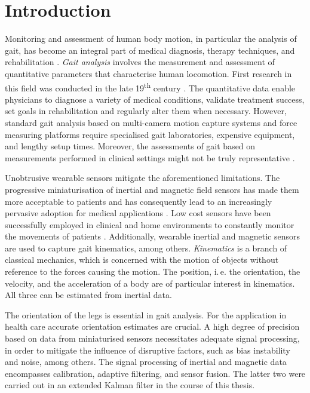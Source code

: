 \chapter{Introduction}
\label{ch:Introduction}

Monitoring and assessment of human body motion, in particular the analysis of gait, has become an integral part of medical diagnosis, therapy techniques, and rehabilitation \cite{tao_gait_2012}. \emph{Gait analysis} involves the measurement and assessment of quantitative parameters that characterise human locomotion. First research in this field was conducted in the late 19\textsuperscript{th} century \cite{tao_gait_2012}. The quantitative data enable physicians to diagnose a variety of medical conditions, validate treatment success, set goals in rehabilitation and regularly alter them when necessary. However, standard gait analysis based on multi-camera motion capture systems and force measuring platforms require specialised gait laboratories, expensive equipment, and lengthy setup times. Moreover, the assessments of gait based on measurements performed in clinical settings might not be truly representative \cite{bonato_advances_2005}.

Unobtrusive wearable sensors mitigate the aforementioned limitations. The progressive miniaturisation of inertial and magnetic field sensors has made them more acceptable to patients and has consequently lead to an increasingly pervasive adoption for medical applications \cite{wee_soon_ambulatory_2008}. Low cost sensors have been successfully employed in clinical and home environments to constantly monitor the movements of patients \cite{godfrey_direct_2008}. Additionally, wearable inertial and magnetic sensors are used to capture gait kinematics, among others. \emph{Kinematics} is a branch of classical mechanics, which is concerned with the motion of objects without reference to the forces causing the motion. The position, i.\,e. the orientation, the velocity, and the acceleration of a body are of particular interest in kinematics. All three can be estimated from inertial data.

The orientation of the legs is essential in gait analysis. For the application in health care accurate orientation estimates are crucial. A high degree of precision based on data from miniaturised sensors necessitates adequate signal processing, in order to mitigate the influence of disruptive factors, such as bias instability and noise, among others. The signal processing of inertial and magnetic data encompasses calibration, adaptive filtering, and sensor fusion. The latter two were carried out in an extended Kalman filter in the course of this thesis.

